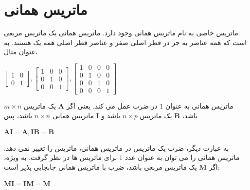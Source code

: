 \section{\textbf{ماتریس همانی}}
\label{sec:2.4}
{
    \Large
    \begin{spacing}{1.5}
        ماتریس خاصی به نام ماتریس همانی وجود دارد.
        ماتریس همانی یک ماتریس مربعی است که همه عناصر به جز در قطر اصلی صفر و عناصر قطر اصلی همه یک هستند.
        به عنوان مثال،
        \begin{center}
            $\begin{bmatrix}
                 1 & 0 \\
                 0 & 1
            \end{bmatrix}, \begin{bmatrix}
                               1 & 0 & 0 \\
                               0 & 1 & 0 \\
                               0 & 0 & 1
            \end{bmatrix}, \begin{bmatrix}
                               1 & 0 & 0 & 0 \\
                               0 & 1 & 0 & 0 \\
                               0 & 0 & 1 & 0 \\
                               0 & 0 & 0 & 1
            \end{bmatrix}$
        \end{center}

        ماتریس همانی به عنوان $1$ در ضرب عمل می کند.
        یعنی اگر $\textbf{A}$ یک ماتریس $m\times n$ باشد، $\textbf{B}$ یک ماتریس $n\times p$ باشد و $\textbf{I}$ ماتریس همانی $n\times n$ باشد، پس

        \begin{center}
            $\textbf{AI}=\textbf{A}, \textbf{IB}=\textbf{B}$
        \end{center}

        به عبارت دیگر، ضرب یک ماتریس در ماتریس همانی، ماتریس را تغییر نمی دهد.
        ماتریس همانی را می توان به عنوان عدد $1$ برای ماتریس ها در نظر گرفت.
        به ویژه، اگر $\textbf{M}$ یک ماتریس مربعی باشد، ضرب با ماتریس همانی جابجایی پذیر است:

        \begin{center}
            $\textbf{MI}=\textbf{IM}=\textbf{M}$
        \end{center}


\end{spacing}}
